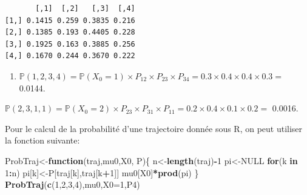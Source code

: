 \documentclass[
]{book}
\newenvironment{Shaded}{\begin{snugshade}}{\end{snugshade}}
\newcommand{\CommentTok}[1]{\textcolor[rgb]{0.56,0.35,0.01}{\textit{#1}}}
\newcommand{\ControlFlowTok}[1]{\textcolor[rgb]{0.13,0.29,0.53}{\textbf{#1}}}
\newcommand{\DataTypeTok}[1]{\textcolor[rgb]{0.13,0.29,0.53}{#1}}
\newcommand{\DecValTok}[1]{\textcolor[rgb]{0.00,0.00,0.81}{#1}}
\newcommand{\KeywordTok}[1]{\textcolor[rgb]{0.13,0.29,0.53}{\textbf{#1}}}
\newcommand{\NormalTok}[1]{#1}
\newcommand{\OperatorTok}[1]{\textcolor[rgb]{0.81,0.36,0.00}{\textbf{#1}}}
\newcommand{\OtherTok}[1]{\textcolor[rgb]{0.56,0.35,0.01}{#1}}
\newcommand{\StringTok}[1]{\textcolor[rgb]{0.31,0.60,0.02}{#1}}
\providecommand{\tightlist}{%
  \setlength{\itemsep}{0pt}\setlength{\parskip}{0pt}}
\theoremstyle{definition}
\theoremstyle{definition}
\theoremstyle{definition}
\theoremstyle{remark}
\begin{document}
\begin{Shaded}
\end{Shaded}

\begin{verbatim}
       [,1]  [,2]   [,3]  [,4]
[1,] 0.1415 0.259 0.3835 0.216
[2,] 0.1385 0.193 0.4405 0.228
[3,] 0.1925 0.163 0.3885 0.256
[4,] 0.1670 0.244 0.3670 0.222
\end{verbatim}

\begin{enumerate}
\def\labelenumi{\arabic{enumi}.}
\setcounter{enumi}{1}
\tightlist
\item
  \(\mathbb{P}(1,2,3,4)=\mathbb{P}(X_0=1)\times P_{12}\times P_{23}\times P_{34}= 0.3 \times 0.4 \times 0.4 \times 0.3 =\) 0.0144.
\end{enumerate}

\(\mathbb{P}(2,3,1,1)=\mathbb{P}(X_0=2)\times P_{23}\times P_{31}\times P_{11}= 0.2 \times 0.4 \times 0.1 \times 0.2 =\) 0.0016.

Pour le calcul de la probabilité d'une trajectoire donnée sous R, on peut utiliser la fonction suivante:

\begin{Shaded}
\begin{Highlighting}[]
\NormalTok{ProbTraj<-}\ControlFlowTok{function}\NormalTok{(traj,mu0,X0, P)\{}
\NormalTok{  n<-}\KeywordTok{length}\NormalTok{(traj)}\OperatorTok{-}\DecValTok{1}
\NormalTok{  pi<-}\OtherTok{NULL}
  \ControlFlowTok{for}\NormalTok{(k }\ControlFlowTok{in} \DecValTok{1}\OperatorTok{:}\NormalTok{n) pi[k]<-P[traj[k],traj[k}\OperatorTok{+}\DecValTok{1}\NormalTok{]]}
\NormalTok{mu0[X0]}\OperatorTok{*}\KeywordTok{prod}\NormalTok{(pi)}
\NormalTok{\}}
\KeywordTok{ProbTraj}\NormalTok{(}\KeywordTok{c}\NormalTok{(}\DecValTok{1}\NormalTok{,}\DecValTok{2}\NormalTok{,}\DecValTok{3}\NormalTok{,}\DecValTok{4}\NormalTok{),mu0,}\DataTypeTok{X0=}\DecValTok{1}\NormalTok{,P4)}
\end{Highlighting}
\end{Shaded}
\end{document}
